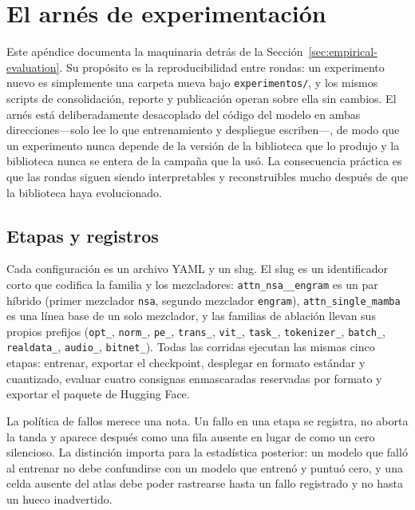 \section{El arnés de experimentación}
\label{sec:annex-experiment-harness}

Este apéndice documenta la maquinaria detrás de la Sección~\ref{sec:empirical-evaluation}. Su propósito es la reproducibilidad entre rondas: un experimento nuevo es simplemente una carpeta nueva bajo \texttt{experimentos/}, y los mismos scripts de consolidación, reporte y publicación operan sobre ella sin cambios. El arnés está deliberadamente desacoplado del código del modelo en ambas direcciones---solo lee lo que entrenamiento y despliegue escriben---, de modo que un experimento nunca depende de la versión de la biblioteca que lo produjo y la biblioteca nunca se entera de la campaña que la usó. La consecuencia práctica es que las rondas siguen siendo interpretables y reconstruibles mucho después de que la biblioteca haya evolucionado.

\subsection{Etapas y registros}

Cada configuración es un archivo YAML y un slug. El slug es un identificador corto que codifica la familia y los mezcladores: \texttt{attn\_nsa\_\_engram} es un par híbrido (primer mezclador \texttt{nsa}, segundo mezclador \texttt{engram}), \texttt{attn\_single\_mamba} es una línea base de un solo mezclador, y las familias de ablación llevan sus propios prefijos (\texttt{opt\_}, \texttt{norm\_}, \texttt{pe\_}, \texttt{trans\_}, \texttt{vit\_}, \texttt{task\_}, \texttt{tokenizer\_}, \texttt{batch\_}, \texttt{realdata\_}, \texttt{audio\_}, \texttt{bitnet\_}). Todas las corridas ejecutan las mismas cinco etapas: entrenar, exportar el checkpoint, desplegar en formato estándar y cuantizado, evaluar cuatro consignas enmascaradas reservadas por formato y exportar el paquete de Hugging Face.

La política de fallos merece una nota. Un fallo en una etapa se registra, no aborta la tanda y aparece después como una fila ausente en lugar de como un cero silencioso. La distinción importa para la estadística posterior: un modelo que falló al entrenar no debe confundirse con un modelo que entrenó y puntuó cero, y una celda ausente del atlas debe poder rastrearse hasta un fallo registrado y no hasta un hueco inadvertido.

